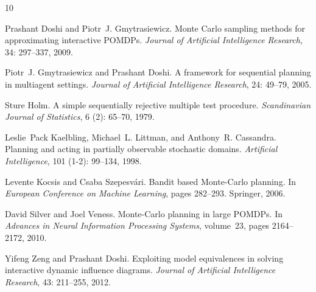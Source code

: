 \begin{thebibliography}{10}

Prashant Doshi and Piotr~J. Gmytrasiewicz.
\newblock Monte {C}arlo sampling methods for approximating interactive {POMDPs}.
\newblock \emph{Journal of Artificial Intelligence Research}, 34: 297--337, 2009.

Piotr~J. Gmytrasiewicz and Prashant Doshi.
\newblock A framework for sequential planning in multiagent settings.
\newblock \emph{Journal of Artificial Intelligence Research}, 24: 49--79, 2005.

Sture Holm.
\newblock A simple sequentially rejective multiple test procedure.
\newblock \emph{Scandinavian Journal of Statistics}, 6 (2): 65--70, 1979.

Leslie~Pack Kaelbling, Michael~L. Littman, and Anthony~R. Cassandra.
\newblock Planning and acting in partially observable stochastic domains.
\newblock \emph{Artificial Intelligence}, 101 (1-2): 99--134, 1998.

Levente Kocsis and Csaba Szepesv{\'a}ri.
\newblock Bandit based {M}onte-{C}arlo planning.
\newblock In \emph{European Conference on Machine Learning}, pages 282--293. Springer, 2006.

David Silver and Joel Veness.
\newblock Monte-{C}arlo planning in large {POMDPs}.
\newblock In \emph{Advances in Neural Information Processing Systems}, volume~23, pages 2164--2172, 2010.

Yifeng Zeng and Prashant Doshi.
\newblock Exploiting model equivalences in solving interactive dynamic influence diagrams.
\newblock \emph{Journal of Artificial Intelligence Research}, 43: 211--255, 2012.

\end{thebibliography}


